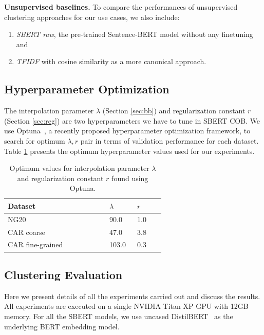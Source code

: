 \documentclass[11pt,a4paper]{article}
\begin{document}

\textbf{Unsupervised baselines.} To compare the performances of unsupervised clustering approaches for our use cases, we also include:
\begin{enumerate}
\item \textit{SBERT raw}, the pre-trained Sentence-BERT model without any finetuning and
\item \textit{TFIDF} with cosine similarity as a more canonical approach.
\end{enumerate}

\subsection{Hyperparameter Optimization} The interpolation parameter $\lambda$ (Section \ref{sec:bb}) and regularization constant $r$ (Section \ref{sec:reg}) are two hyperparameters we have to tune in SBERT COB. We use Optuna~\citep{optuna_2019}, a recently proposed hyperparameter optimization framework, to search for optimum $\lambda, r$ pair in terms of validation performance for each dataset. Table \ref{tab:hyp} presents the optimum hyperparameter values used for our experiments.

\begin{table}[t]
\begin{small}
\caption{Optimum values for interpolation parameter $\lambda$ and regularization constant $r$ found using Optuna.}
\label{tab:hyp}
\begin{tabular}{p{0.55\linewidth}p{0.15\linewidth}p{0.15\linewidth}}
\hline
Dataset        & $\lambda$ & $r$ \\ \hline
NG20     & 90.0 & 1.0 \\
CAR coarse & 47.0 & 3.8 \\
CAR fine-grained & 103.0 & 0.3 
\end{tabular}
\end{small}
\end{table}

\subsection{Clustering Evaluation} Here we present details of all the experiments carried out and discuss the results. All experiments are executed on a single NVIDIA Titan XP GPU with 12GB memory. For all the SBERT models, we use uncased DistilBERT~\citep{sanh2019distilbert} as the underlying BERT embedding model.
\end{document}

